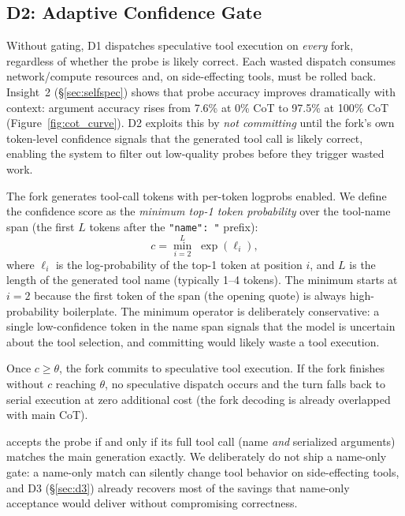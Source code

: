 \subsection{D2: Adaptive Confidence Gate}
\label{sec:d2}

Without gating, D1 dispatches speculative tool execution on \emph{every} fork, regardless
of whether the probe is likely correct.
Each wasted dispatch consumes network/compute resources and, on side-effecting tools, must
be rolled back.
Insight~2 (\S\ref{sec:selfspec}) shows that probe accuracy improves dramatically with
context: argument accuracy rises from 7.6\% at 0\% CoT to 97.5\% at 100\% CoT
(Figure~\ref{fig:cot_curve}).
D2 exploits this by \emph{not committing} until the fork's own token-level confidence
signals that the generated tool call is likely correct, enabling the system to filter
out low-quality probes before they trigger wasted work.

The fork generates tool-call tokens with per-token logprobs enabled.
We define the confidence score as the \emph{minimum top-1 token probability} over the
tool-name span (the first $L$ tokens after the \texttt{"name":~"} prefix):
\begin{equation}
  c = \min_{i=2}^{L}\; \exp(\ell_i),
  \label{eq:confidence}
\end{equation}
where $\ell_i$ is the log-probability of the top-1 token at position $i$, and $L$ is
the length of the generated tool name (typically 1--4 tokens).
The minimum starts at $i=2$ because the first token of the span (the opening quote)
is always high-probability boilerplate.
The minimum operator is deliberately conservative: a single low-confidence token in the
name span signals that the model is uncertain about the tool selection, and committing
would likely waste a tool execution.

Once $c \geq \theta$, the fork commits to speculative tool execution.
If the fork finishes without $c$ reaching $\theta$, no speculative dispatch occurs and
the turn falls back to serial execution at zero additional cost (the fork decoding is
already overlapped with main CoT).

\spork{} accepts the probe if and only if its full tool call (name \emph{and} serialized
arguments) matches the main generation exactly.
We deliberately do not ship a name-only gate: a name-only match can silently change tool
behavior on side-effecting tools, and D3 (\S\ref{sec:d3}) already recovers most of the
savings that name-only acceptance would deliver without compromising correctness.

